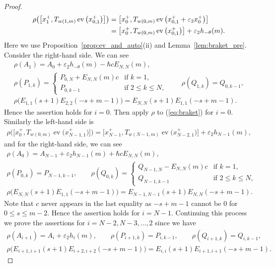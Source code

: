 \documentclass[11pt]{article}
\theoremstyle{definition}
\numberwithin{equation}{section}
\DeclareMathOperator{\ev}{ev}
\newcommand{\ve}{\varepsilon}
\begin{document}
\begin{proof}
\begin{gather*}
\begin{split}&
 \rho\big(\big[x_1^+, T_{w(1,m)} \ev\big(x_{0,1}^+\big)\big]\big)=\big[x_0^+, T_{w(0,m)} \ev\big(x_{0,1}^++\ve_2 x_0^+\big)\big]\\
& \hphantom{\rho\big(\big[x_1^+, T_{w(1,m)} \ev\big(x_{0,1}^+\big)\big]\big)}{} = \big[x_0^+, T_{w(0,m)} \ev\big(x_{0,1}^+\big)\big] + \ve_2 h_{-\theta}(m).
\end{split}
\end{gather*}
Here we use Proposition~\ref{prop:ev_and_auto}(ii) and Lemma~\ref{lem:braket_pre}. Consider the right-hand side. We can see
\begin{gather*}
\rho(A_1) = A_0 + \ve_2 h_{-\theta}(m) - \hbar c E_{N,N}(m),\\
\rho(P_{1,k}) = \begin{cases}
P_{0,N} + E_{N,N}(m)c & \text{if $k=1$},\\
P_{0,k-1} & \text{if $2 \leq k \leq N$},
\end{cases}\qquad
\rho(Q_{1,k}) = Q_{0,k-1},\\
\rho\big(E_{1,1}(s+1)E_{2,2}(-s+m-1)\big) = E_{N,N}(s+1)E_{1,1}(-s+m-1).
\end{gather*}
Hence the assertion holds for $i=0$. Then apply $\rho$ to (\ref{eq:braket}) for $i=0$. Similarly the left-hand side is
\begin{gather*}
 \rho\big(\big[x_0^+, T_{w(0,m)} \ev\big(x_{N-1,1}^+\big)\big]\big)= \big[x_{N-1}^+, T_{w(N-1,m)} \ev\big(x_{N-2,1}^+\big)\big] + \ve_2 h_{N-1}(m),
\end{gather*}
and for the right-hand side, we can see
\begin{gather*}
\rho(A_0) = A_{N-1} + \ve_2 h_{N-1}(m) + \hbar c E_{N,N}(m),\\
\rho(P_{0,k}) = P_{N-1,k-1}, \qquad \rho(Q_{0,k}) = \begin{cases}
Q_{N-1,N} - E_{N,N}(m)c & \text{if $k=1$},\\
Q_{N-1,k-1} & \text{if $2 \leq k \leq N$},
\end{cases}\\
\rho\big(E_{N,N}(s+1)E_{1,1}(-s+m-1)\big) = E_{N-1,N-1}(s+1)E_{N,N}(-s+m-1).
\end{gather*}
Note that $c$ never appears in the last equality as $-s+m-1$ cannot be $0$ for $0 \leq s \leq m-2$. Hence the assertion holds for $i=N-1$. Continuing this process we prove the assertions for $i=N-2, N-3,\ldots,2$ since we have
\begin{gather*}
\rho(A_{i+1}) = A_{i} + \ve_2 h_{i}(m),\qquad \rho(P_{i+1,k}) = P_{i,k-1}, \qquad \rho(Q_{i+1,k}) =Q_{i,k-1},\\
\rho\big(E_{i+1,i+1}(s+1)E_{i+2,i+2}(-s+m-1)\big) = E_{i,i}(s+1)E_{i+1,i+1}(-s+m-1).\tag*{\qed}
\end{gather*}\renewcommand{\qed}{}
\end{proof}
\end{document}
